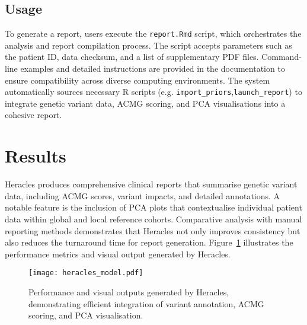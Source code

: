 \subsection{Usage}
\noindent
To generate a report, users execute the \texttt{report.Rmd} script, which orchestrates the analysis and report compilation process. The script accepts parameters such as the patient ID, data checksum, and a list of supplementary PDF files. Command-line examples and detailed instructions are provided in the documentation to ensure compatibility across diverse computing environments. The system automatically sources necessary R scripts (e.g. \texttt{import\_priors},\texttt{launch\_report}) to integrate genetic variant data, ACMG scoring, and PCA visualisations into a cohesive report.

\section{Results}
\noindent
Heracles produces comprehensive clinical reports that summarise genetic variant data, including ACMG scores, variant impacts, and detailed annotations. A notable feature is the inclusion of PCA plots that contextualise individual patient data within global and local reference cohorts. Comparative analysis with manual reporting methods demonstrates that Heracles not only improves consistency but also reduces the turnaround time for report generation. Figure~\ref{fig:performance} illustrates the performance metrics and visual output generated by Heracles.

\begin{figure}[ht]
    \centering
    \texttt{[image: heracles\_model.pdf]}
    \caption{Performance and visual outputs generated by Heracles, demonstrating efficient integration of variant annotation, ACMG scoring, and PCA visualisation.}
    \label{fig:performance}
\end{figure}


